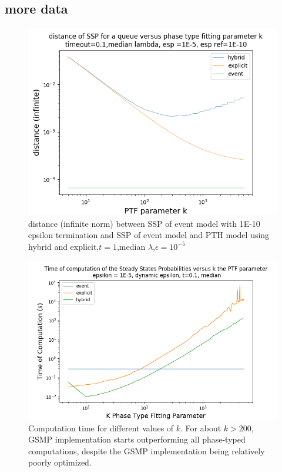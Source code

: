 \documentclass[paper=a4, fontsize=11pt]{scrartcl}
\numberwithin{equation}{section}		%
\numberwithin{figure}{section}			%
\numberwithin{table}{section}				%
\begin{document}
\subsection{more data}
\begin{figure}
	\centering
	\includegraphics[width=17cm]{picture/New_model/distance_versus_k.png}
	\caption{distance (infinite norm) between SSP of event model with 1E-10 epsilon termination and SSP of event model and PTH model using hybrid and explicit,$t=1$,median $\lambda$,$\epsilon=10^{-5}$}
	\label{fig:dist_versus_k}
\end{figure}


\begin{figure}
	\centering
	\includegraphics[width=16cm]{picture/New_model/performance_versus_k.png}
	\caption{Computation time for different values of $k$. For about $k>200$, GSMP implementation starts outperforming all phase-typed computations, despite the GSMP implementation being relatively poorly optimized.}
	\label{fig:performance}
\end{figure}


\end{document}
